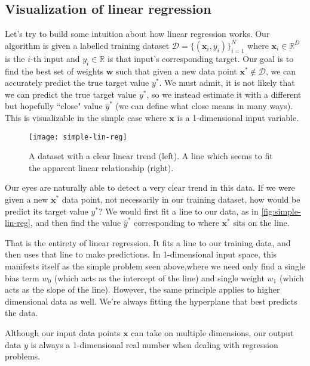 \subsection{Visualization of linear regression}
Let's try to build some intuition about how linear regression works. Our algorithm is given a labelled training dataset $\mathcal D = \{(\bm x_i, y_i)\}_{i=1}^{N}$ where $\mathbf{x}_i \in \mathbb{R}^D$ is the $i$-th input and $y_i \in \mathbb R$ is that input's corresponding target. Our goal is to find the best set of weights $\bm w$ such that given a new data point $\bm x^* \not \in \mathcal D$, we can accurately predict the true target value $y^*$. We must admit, it is not likely that we can predict the true target value $y^*$, so we instead estimate it with a different but hopefully ``close" value $\hat y^*$ (we can define what close means in many ways). This is visualizable in the simple case where $\bm x$ is a 1-dimensional input variable.

\begin{figure}
    \centering
    \texttt{[image: simple-lin-reg]}
    \caption{A dataset with a clear linear trend (left). A line which seems to fit the apparent linear relationship (right).}
    \label{fig:simple-lin-reg}
\end{figure}

Our eyes are naturally able to detect a very clear trend in this data. If we were given a new $\bm x^*$ data point, not necessarily in our training dataset, how would be predict its target value $y^*$? We would first fit a line to our data, as in \autoref{fig:simple-lin-reg}, and then find the value $\hat y^*$ corresponding to where $\bm x^*$ sits on the line.

That is the entirety of linear regression. It fits a line to our training data, and then uses that line to make predictions. In 1-dimensional input space, this manifests itself as the simple problem seen above,where  we need only find a single bias term $w_0$ (which acts as the intercept of the line) and single weight $w_1$ (which acts as the slope of the line). However, the same principle applies to higher dimensional data as well. We're always fitting the hyperplane that best predicts the data.

\begin{warning}
    Although our input data points $\bm x$ can take on multiple dimensions, our output data $y$ is always a 1-dimensional real number when dealing with regression problems.
\end{warning}

